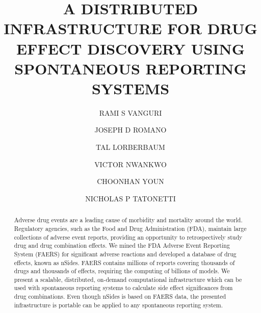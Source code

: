 \documentclass{ws-procs11x85}
\begin{document}
\title{A DISTRIBUTED INFRASTRUCTURE FOR DRUG EFFECT DISCOVERY USING SPONTANEOUS REPORTING SYSTEMS}

\author{RAMI S VANGURI}

\address{Department of Biomedical Informatics, Columbia University,\\
New York, NY 10032 USA\\
E-mail: r.vanguri@columbia.edu}

\author{JOSEPH D ROMANO}

\address{Department of Biomedical Informatics, Columbia University,\\
New York, NY 10032 USA\\
E-mail: jdr2160@columbia.edu}

\author{TAL LORBERBAUM}

\address{Department of Biomedical Informatics, Columbia University,\\
New York, NY 10032 USA\\
E-mail: tal.lorberbaum@columbia.edu}

\author{VICTOR NWANKWO}

\address{Department of Biomedical Informatics, Columbia University,\\
New York, NY 10032 USA\\
E-mail: vtn2106@columbia.edu}

\author{CHOONHAN YOUN}

\address{San Diego Supercomputer Center, University of California, San Diego,\\
La Jolla, CA 92093 USA\\
E-mail: cyoun@sdsc.edu}

\author{NICHOLAS P TATONETTI}

\address{Department of Biomedical Informatics, Columbia University,\\
New York, NY 10032 USA\\
E-mail: nick.tatonetti@columbia.edu}

\begin{abstract}
Adverse drug events are a leading cause of morbidity and mortality
around the world. Regulatory agencies, such as the Food and Drug
Administration (FDA), maintain large collections of adverse event
reports, providing an opportunity to retrospectively study drug and
drug combination effects.  We mined the FDA Adverse Event Reporting
System (FAERS) for significant adverse reactions and developed a
database of drug effects, known as nSides. FAERS contains millions of
reports covering thousands of drugs and thousands of effects,
requiring the computing of billions of models. We present a scalable,
distributed, on-demand computational infrastructure which can be used
with spontaneous reporting systems to calculate side effect
significances from drug combinations. Even though nSides is based on
FAERS data, the presented infrastructure is portable can be applied to
any spontaneous reporting system.
\end{abstract}
\end{document}
